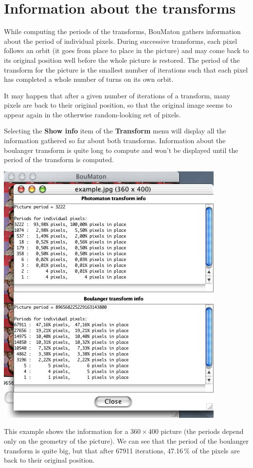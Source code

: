 \documentclass[a4paper]{article}
\newcommand{\BouMaton}{\textsf{BouMaton}\xspace}
\newcommand{\menu}[1]{\textsf{\textbf{#1}}}
\newcommand{\picdim}[2]{#1\,\(\times\)\,#2}
\begin{document}
  \section{Information about the transforms}
  While computing the periods of the transforms, \BouMaton gathers 
  information about the period of individual pixels. During successive 
  transforms, each pixel follows an orbit (it goes from place to place 
  in the picture) and may come back to its original position well 
  before the whole picture is restored. The period of the transform for 
  the picture is the smallest number of iterations such that each pixel 
  has completed a whole number of turns on its own orbit.
  
  It may happen that after a given number of iterations of a 
  transform, many pixels are back to their original position, so that 
  the original image seems to appear again in the otherwise 
  random-looking set of pixels.
  
  Selecting the \menu{Show info} item of the \menu{Transform} menu 
  will display all the information gathered so far about both transforms. 
  Information about the boulanger transform is quite long to compute 
  and won't be displayed until the period of the transform is computed.
  
  \begin{center}
    \includegraphics[scale=0.4]{info_example}
  \end{center}
  This example shows the information for a \picdim{360}{400} picture 
  (the periods depend only on the geometry of the picture). We can see 
  that the period of the boulanger transform is quite big, but that 
  after 67911 iterations, 47.16\,\% of the pixels are back to their 
  original position.
  
\end{document}
